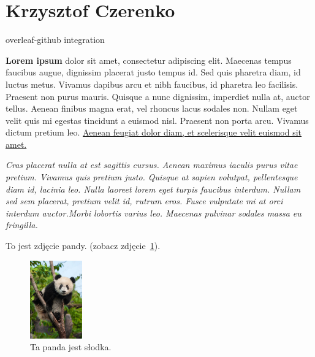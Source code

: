 \section{Krzysztof Czerenko}
\label{sec:krzyczer}

overleaf-github integration

\begin {flushleft}
\textbf{Lorem ipsum} dolor sit amet, consectetur adipiscing elit. Maecenas tempus faucibus augue, dignissim placerat justo tempus id. Sed quis pharetra diam, id luctus metus. Vivamus dapibus arcu et nibh faucibus, id pharetra leo facilisis. Praesent non purus mauris. Quisque a nunc dignissim, imperdiet nulla at, auctor tellus. Aenean finibus magna erat, vel rhoncus lacus sodales non. Nullam eget velit quis mi egestas tincidunt a euismod nisl. Praesent non porta arcu. Vivamus dictum pretium leo. \underline{Aenean feugiat dolor diam, et scelerisque velit euismod sit amet.}\par
\end {flushleft}

\begin {center}
\textit{Cras placerat nulla at est sagittis cursus. Aenean maximus iaculis purus vitae pretium. Vivamus quis pretium justo. Quisque at sapien volutpat, pellentesque diam id, lacinia leo. Nulla laoreet lorem eget turpis faucibus interdum. Nullam sed sem placerat, pretium velit id, rutrum eros. Fusce vulputate mi at orci interdum auctor.Morbi lobortis varius leo. Maecenas pulvinar sodales massa eu fringilla.}\par
\end{center}

\vspace{2em}

To jest zdjęcie pandy. (zobacz zdjęcie~\ref{fig:panda}).

\vspace{2em}

\begin{figure}[htbp] 
    \centering
    \includegraphics[width=0.2\textwidth]{pictures/baby_panda.jpg} 
    \caption{Ta panda jest słodka.}
    \label{fig:panda}
\end{figure}

